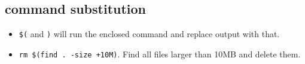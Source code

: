 \subsection{command substitution}
\begin{itemize}
\item \texttt{\$(} and \texttt{)} will run the enclosed command and
  replace output with that.
\item \texttt{rm \$(find . -size +10M)}. Find all files larger than
  10MB and delete them. 
\end{itemize}
